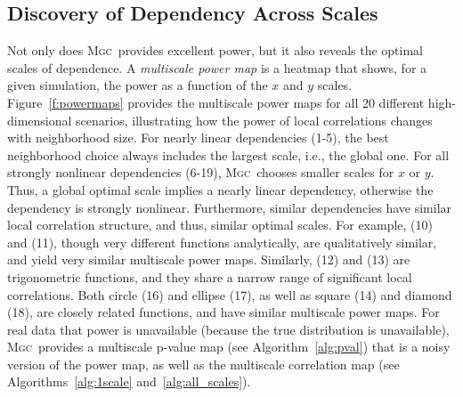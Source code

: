 \documentclass[11pt]{article}
\providecommand{\sct}[1]{{\normalfont\textsc{#1}}}
\newcommand{\Mgc}{\sct{Mgc}}
\begin{document}
\subsection*{Discovery of Dependency Across Scales}
\label{main3}

Not only does \Mgc~provides excellent power, but it also reveals the optimal scales of dependence. 
A \emph{multiscale power map} is a heatmap that shows, for a given simulation, the power as a function of the $x$ and $y$ scales.  
Figure~\ref{f:powermaps} provides the multiscale power maps for all 20 different high-dimensional scenarios, illustrating how the power of local correlations changes with  neighborhood size.
For nearly linear dependencies (1-5), the best neighborhood choice always includes the largest scale, i.e., the global one. For all strongly nonlinear dependencies (6-19),  \Mgc~chooses smaller scales for $x$ or $y$. Thus, a global optimal scale implies a nearly linear dependency, otherwise the dependency is strongly nonlinear.
Furthermore, similar dependencies have similar local correlation structure, and thus, similar optimal scales. For example, (10) and (11), though very different functions analytically, are qualitatively similar, and yield very similar multiscale power maps.
Similarly,  (12) and (13) are trigonometric functions, and they share a narrow range of significant local correlations.
Both circle (16) and ellipse (17), as well as square (14) and diamond (18), are closely related functions, and have similar multiscale power maps. 
For real data that power is unavailable (because the true distribution is unavailable), \Mgc~provides a multiscale p-value map (see Algorithm~\ref{alg:pval}) that is a noisy version of the power map, as well as the multiscale correlation map (see Algorithms~\ref{alg:1scale} and~\ref{alg:all_scales}).
\end{document}
